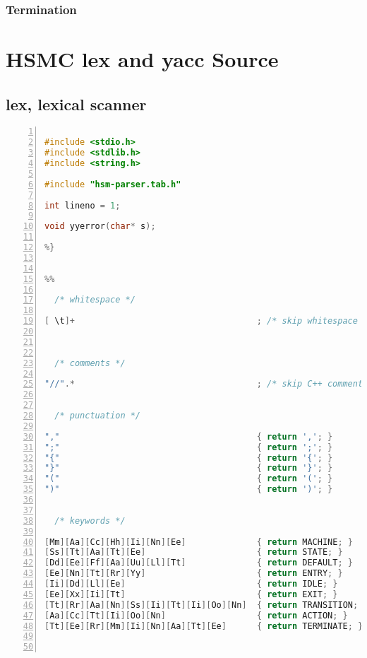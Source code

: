 \documentclass[titlepage,letterpaper]{report}
\begin{document}
\label{hsm:default}

\subsection{Termination}

\label{hsm:termination}



\chapter{HSMC lex and yacc Source}

\section{lex, lexical scanner}
\begin{lstlisting}[language=C,caption={hsmc.l (lex source)},numbers=left,columns=fixed]
%{

#include <stdio.h>
#include <stdlib.h>
#include <string.h>

#include "hsm-parser.tab.h"

int lineno = 1;

void yyerror(char* s);

%}


%%

  /* whitespace */

[ \t]+                                    ; /* skip whitespace */

  

  /* comments */

"//".*                                    ; /* skip C++ comments */


  /* punctuation */

","                                       { return ','; }
";"                                       { return ';'; }
"{"                                       { return '{'; }
"}"                                       { return '}'; }
"("                                       { return '('; }
")"                                       { return ')'; }


  /* keywords */

[Mm][Aa][Cc][Hh][Ii][Nn][Ee]              { return MACHINE; }
[Ss][Tt][Aa][Tt][Ee]                      { return STATE; }
[Dd][Ee][Ff][Aa][Uu][Ll][Tt]              { return DEFAULT; }
[Ee][Nn][Tt][Rr][Yy]                      { return ENTRY; }
[Ii][Dd][Ll][Ee]                          { return IDLE; }
[Ee][Xx][Ii][Tt]                          { return EXIT; }
[Tt][Rr][Aa][Nn][Ss][Ii][Tt][Ii][Oo][Nn]  { return TRANSITION; }
[Aa][Cc][Tt][Ii][Oo][Nn]                  { return ACTION; }
[Tt][Ee][Rr][Mm][Ii][Nn][Aa][Tt][Ee]      { return TERMINATE; }



\end{lstlisting}
\end{document}
